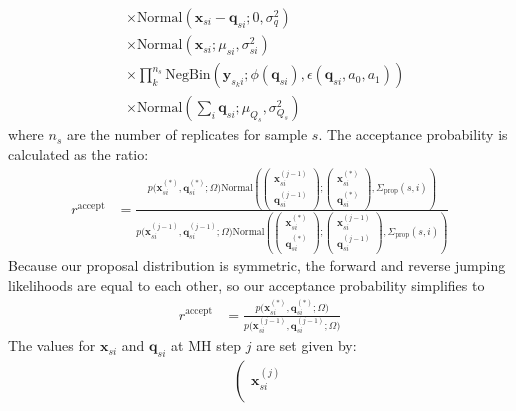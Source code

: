\documentclass{article}
\newcommand{\var}{\sigma^2}
\newcommand{\Normaldist}{\text{Normal}}
\newcommand{\NegBindist}{\text{NegBin}}
\newcommand{\qq}{\mathbf{q}}
\newcommand{\xx}{\mathbf{x}}
\newcommand{\yy}{\mathbf{y}}
\newcommand{\varcoupling}{\var_q}
\begin{document}
\begin{appendices}
\begin{align}
  		& \times \Normaldist(\xx_{si} - \qq_{si}; 0, \varcoupling) \nonumber \\
  		& \times \Normaldist(\xx_{si}; \mu_{si}, \sigma^2_{si}) \nonumber \\
      & \times \prod_k^{n_{s}} \NegBindist(\yy_{s_k i}; \phi(\qq_{si}), \epsilon(\qq_{si}, a_0, a_1)) \nonumber \\
      & \times \Normaldist(\sum_i \qq_{si}; \mu_{Q_s}, \sigma^2_{Q_s} ) \nonumber
  \end{align}
  where $n_s$ are the number of replicates for sample $s$. The acceptance probability is calculated as the ratio:
  \begin{align}
  	r^{\text{accept}} & = \frac
  		{p \Big( \xx_{si}^{(*)}, \qq_{si}^{(*)}; \Omega \Big)
      \Normaldist \left(
    		\left(
    		\begin{array}{ccc}
    			\xx_{si}^{(j-1)} \\
    			\qq_{si}^{(j-1)}
    		\end{array} \right);
        \left( \begin{array}{ccc}
    			\xx_{si}^{(*)} \\
    			\qq_{si}^{(*)}
    		\end{array} \right), \Sigma_{\text{prop}}(s,i)
    	\right)}
  		{p \Big( \xx_{si}^{(j-1)}, \qq_{si}^{(j-1)}; \Omega \Big)
      \Normaldist \left(
    		\left(
    		\begin{array}{ccc}
    			\xx_{si}^{(*)} \\
    			\qq_{si}^{(*)}
    		\end{array} \right);
        \left( \begin{array}{ccc}
    			\xx_{si}^{(j-1)} \\
    			\qq_{si}^{(j-1)}
    		\end{array} \right), \Sigma_{\text{prop}}(s,i)
    	\right)}
  \end{align}
  Because our proposal distribution is symmetric, the forward and reverse jumping likelihoods are equal to each other, so our acceptance probability simplifies to
  \begin{align}
  	r^{\text{accept}} & = \frac
  		{p \Big( \xx_{si}^{(*)}, \qq_{si}^{(*)}; \Omega \Big)}
  		{p \Big( \xx_{si}^{(j-1)}, \qq_{si}^{(j-1)}; \Omega \Big)}
  \end{align}
  The values for $\xx_{si}$ and $\qq_{si}$ at MH step $j$ are set given by:
  \begin{align}
  	\left(
  	\begin{array}{ccc}
  		\xx_{si}^{(j)} \\

\end{array}
\end{align}
\end{appendices}
\end{document}
